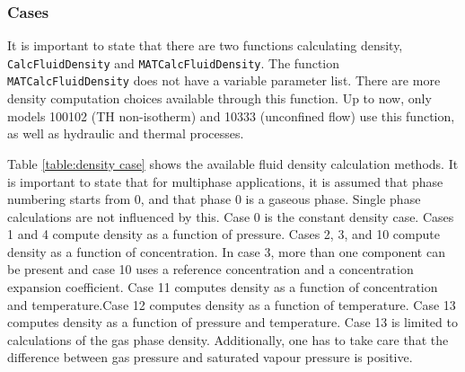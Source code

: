 \subsubsection*{Cases}
It is important to state that there are two functions calculating
density, \texttt{CalcFluidDensity} and
\texttt{MATCalcFluidDensity}. The function
\texttt{MATCalcFluidDensity} does not have a variable parameter
list.  There are more density computation choices available
through this function.  Up to now, only models 100102 (TH
non-isotherm) and 10333 (unconfined flow) use this function, as
well as hydraulic and thermal processes.

Table \ref{table:density case} shows the available fluid density
calculation methods. It is important to state that for multiphase
applications, it is assumed that phase numbering starts from 0,
and that phase 0 is a gaseous phase.  Single phase calculations
are not influenced by this.  Case 0 is the constant density case.
Cases 1 and 4 compute density as a function of pressure. Cases 2,
3, and 10 compute density as a function of concentration. In case
3, more than one component can be present and case 10 uses a
reference concentration and a concentration expansion coefficient.
Case 11 computes density as a function of concentration and
temperature.Case 12 computes density as a function of temperature.
Case 13 computes density as a function of pressure and
temperature. Case 13 is limited to calculations of the gas phase
density. Additionally, one has to take care that the difference
between gas pressure and saturated vapour pressure is positive.

